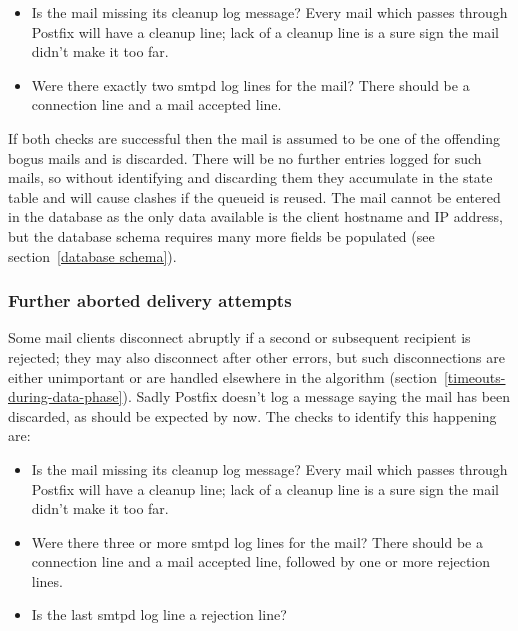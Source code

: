 \documentclass[a4paper,12pt,draft]{article}
\begin{document}
\begin{itemize}

    \item Is the mail missing its cleanup log message?  Every mail which
        passes through Postfix will have a cleanup line; lack of a cleanup
        line is a sure sign the mail didn't make it too far.

    \item Were there exactly two smtpd log lines for the mail?  There
        should be a connection line and a mail accepted line.

\end{itemize}

If both checks are successful then the mail is assumed to be one of the
offending bogus mails and is discarded.  There will be no further entries
logged for such mails, so without identifying and discarding them they
accumulate in the state table and will cause clashes if the queueid is
reused.  The mail cannot be entered in the database as the only data
available is the client hostname and IP address, but the database schema
requires many more fields be populated (see section~\ref{database schema}).

\subsubsection{Further aborted delivery attempts}

Some mail clients disconnect abruptly if a second or subsequent recipient
is rejected; they may also disconnect after other errors, but such
disconnections are either unimportant or are handled elsewhere in the
algorithm (section~\ref{timeouts-during-data-phase}).  Sadly Postfix
doesn't log a message saying the mail has been discarded, as should be
expected by now.  The checks to identify this happening are:

\begin{itemize}

    \item Is the mail missing its cleanup log message?  Every mail which
        passes through Postfix will have a cleanup line; lack of a cleanup
        line is a sure sign the mail didn't make it too far.

    \item Were there three or more smtpd log lines for the mail?  There
        should be a connection line and a mail accepted line, followed by
        one or more rejection lines.

    \item Is the last smtpd log line a rejection line?

\end{itemize}
\end{document}
